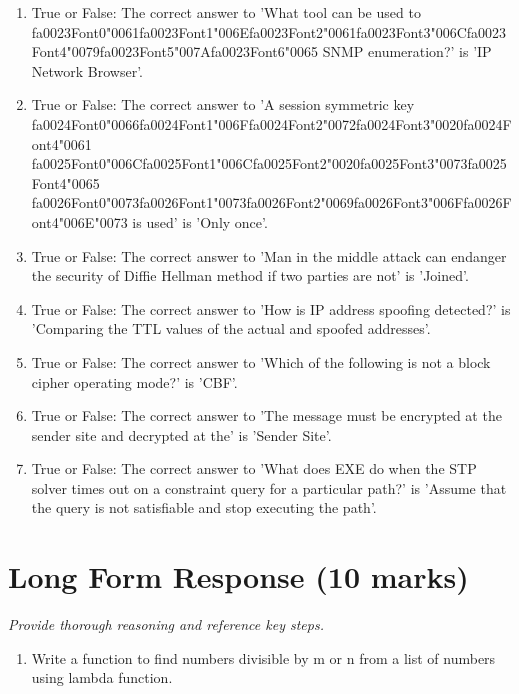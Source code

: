 \documentclass[12pt]{article}
\begin{document}
\begin{enumerate}[label=\arabic*.]
\item True or False: The correct answer to 'What tool can be used to {\csname fa0023Font0\endcsname\char"0061}{\csname fa0023Font1\endcsname\char"006E}{\csname fa0023Font2\endcsname\char"0061}{\csname fa0023Font3\endcsname\char"006C}{\csname fa0023Font4\endcsname\char"0079}{\csname fa0023Font5\endcsname\char"007A}{\csname fa0023Font6\endcsname\char"0065} SNMP enumeration?' is 'IP Network Browser'.
\item True or False: The correct answer to 'A session symmetric key {\csname fa0024Font0\endcsname\char"0066}{\csname fa0024Font1\endcsname\char"006F}{\csname fa0024Font2\endcsname\char"0072}{\csname fa0024Font3\endcsname\char"0020}{\csname fa0024Font4\endcsname\char"0061} {\csname fa0025Font0\endcsname\char"006C}{\csname fa0025Font1\endcsname\char"006C}{\csname fa0025Font2\endcsname\char"0020}{\csname fa0025Font3\endcsname\char"0073}{\csname fa0025Font4\endcsname\char"0065} {\csname fa0026Font0\endcsname\char"0073}{\csname fa0026Font1\endcsname\char"0073}{\csname fa0026Font2\endcsname\char"0069}{\csname fa0026Font3\endcsname\char"006F}{\csname fa0026Font4\endcsname\char"006E}{\char"0073} is used' is 'Only once'.
\item True or False: The correct answer to 'Man in the middle attack can endanger the security of Diffie Hellman method if two parties are not' is 'Joined'.
\item True or False: The correct answer to 'How is IP address spoofing detected?' is 'Comparing the TTL values of the actual and spoofed addresses'.
\item True or False: The correct answer to 'Which of the following is not a block cipher operating mode?' is 'CBF'.
\item True or False: The correct answer to 'The message must be encrypted at the sender site and decrypted at the' is 'Sender Site'.
\item True or False: The correct answer to 'What does EXE do when the STP solver times out on a constraint query for a particular path?' is 'Assume that the query is not satisfiable and stop executing the path'.
\end{enumerate}

\section*{Long Form Response (10 marks)}
\textit{Provide thorough reasoning and reference key steps.}
\begin{enumerate}[label=\arabic*.]
\item Write a function to find numbers divisible by m or n from a list of numbers using lambda
function.
\end{enumerate}
\end{document}
